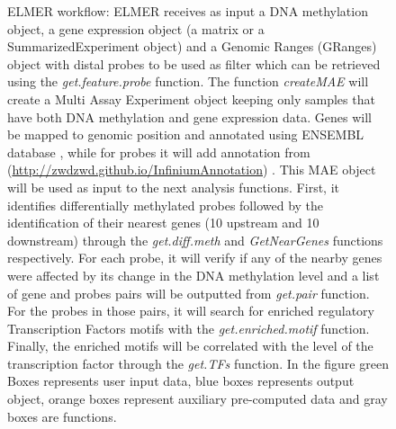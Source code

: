 \begin{figure}[!ht]
{
  }%
  
  \caption[ELMER workflow]{ELMER workflow: ELMER receives as input a DNA methylation object, a gene expression object (a matrix or a SummarizedExperiment object) and a Genomic Ranges (GRanges) object with distal probes to be used as filter which can be retrieved using the \textit{get.feature.probe} function. The function \textit{createMAE}  will create a Multi Assay Experiment object keeping only samples that have both DNA methylation and gene expression data. Genes will be mapped to genomic position and annotated using ENSEMBL database \cite{doi:10.1093/database/baw093}, while for probes it will add annotation from \citeauthor{doi:10.1093/nar/gkw967} (\href{http://zwdzwd.github.io/InfiniumAnnotation}{http://zwdzwd.github.io/InfiniumAnnotation}) . This MAE object will be used as input to the next analysis functions. First, it identifies differentially methylated probes followed by the identification of their nearest genes (10 upstream and 10 downstream) through the  \textit{get.diff.meth} and  \textit{GetNearGenes} functions respectively. For each probe, it will verify if any of the nearby genes were affected by its change in the DNA methylation level and a list of  gene and probes pairs will be outputted from \textit{get.pair} function. For the probes in those pairs, it will search for enriched regulatory Transcription Factors motifs with the  \textit{get.enriched.motif} function. Finally, the  enriched motifs will be correlated with the level of the transcription factor through the \textit{get.TFs} function. In the figure green Boxes represents user input data, blue boxes represents output object, orange boxes represent auxiliary pre-computed data and gray boxes are functions.}
  \label{fig:elmerworkflow}
\end{figure}
